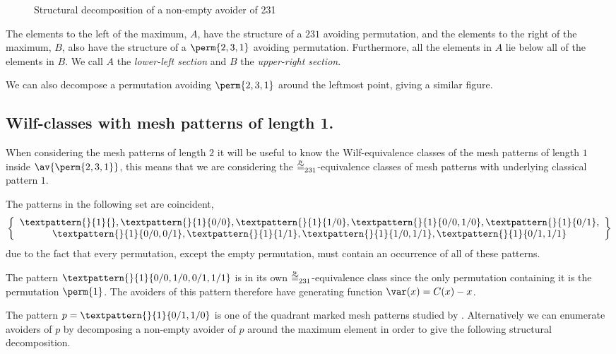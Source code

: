 \begin{figure}[!ht]
    \centering
    \caption{Structural decomposition of a non-empty avoider of 231}
    \label{fig:decompmax}
\end{figure}

The elements to the left of the maximum, \(A\), have the structure of a \(231\)
avoiding permutation, and the elements to the right of the maximum, \(B\), also have
the structure of a \(\perm{2,3,1}\) avoiding permutation. Furthermore, all the
elements in \(A\) lie below all of the elements in \(B\). We call \(A\) the
\emph{lower-left section} and \(B\) the \emph{upper-right section}.

We can also decompose a permutation avoiding \(\perm{2,3,1}\) around the
leftmost point, giving a similar figure.

\subsection{Wilf-classes with mesh patterns of length 1.}
\label{wilf1}
When considering the mesh patterns of length \(2\) it will be useful to know the
Wilf-equivalence classes of the mesh patterns of length \(1\) inside
\(\av{\perm{2,3,1}}\), this means that we are considering the
\(\weqv{231}\)-equivalence classes of mesh patterns with underlying classical
pattern \(1\).

The patterns in the following set are coincident,
\begin{equation*}
    \left\{
        \begin{array}{c}
        \textpattern{}{1}{},
        \textpattern{}{1}{0/0},
        \textpattern{}{1}{1/0},
        \textpattern{}{1}{0/0,1/0},
        \textpattern{}{1}{0/1},\\
        \textpattern{}{1}{0/0,0/1},
        \textpattern{}{1}{1/1},
        \textpattern{}{1}{1/0,1/1},
        \textpattern{}{1}{0/1,1/1}
    \end{array}
    \right\}
\end{equation*}
due to the fact that every permutation, except the empty
permutation, must contain an occurrence of all of these patterns.

The pattern \(\textpattern{}{1}{0/0,1/0,0/1,1/1}\) is in its own
\(\weqv{231}\)-equivalence class since the only permutation containing it is
the permutation \(\perm{1}\). The avoiders of this pattern therefore
have generating function \(\var(x) = C(x)-x\).

\nextvar
The pattern \(p = \textpattern{}{1}{0/1,1/0}\) is one of the
quadrant marked mesh patterns studied by \textcite{2012arXiv1201.6243K}.
Alternatively we can enumerate
avoiders of \(p\) by decomposing a non-empty avoider of \(p\) around the
maximum element
in order to give the following structural decomposition.

